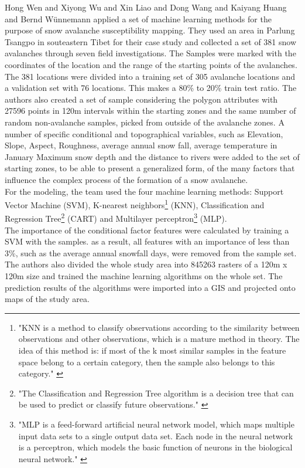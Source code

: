 \documentclass[../masterarbeit.tex]{subfiles}
\begin{document}
Hong Wen and Xiyong Wu and Xin Liao and Dong Wang and Kaiyang Huang and Bernd Wünnemann \textcite[]{WEN2022103535} applied a set of machine learning methods for the purpose of snow avalanche susceptibility mapping. They used an area in Parlung Tsangpo in souteastern Tibet for their case study and collected a set of 381 snow avalanches through seven field investigations. The Samples were marked with the coordinates of the location and the range  of the starting points of the avalanches. 
The 381 locations were divided into a training set of 305 avalanche locations and a validation set with 76 locations. This makes a 80\% to 20\% train test ratio.
The authors also created a set of sample considering the polygon attributes with 27596 points in 120m intervals within the starting zones and the same number of random non-avalanche samples, picked from outside of the avalanche zones. 
A number of specific conditional and topographical variables, such as Elevation, Slope, Aspect, Roughness, average annual snow fall, average temperature in January Maximum snow depth and the distance to rivers were added to the set of starting zones, to be able to present a generalized form, of the many factors that influence the complex process of the formation of a snow avalanche. \autocite[]{WEN2022103535} \\
For the modeling, the team used the four machine learning methods: Support Vector Machine (SVM), K-nearest neighbors\footnote{"KNN is a method to classify observations according to the similarity between observations and other observations, which is a mature method in theory. The idea of this method is: if most of the k most similar samples in the feature space belong to a certain category, then the sample also belongs to this category." \autocite[]{WEN2022103535} } (KNN), Classification and Regression Tree\footnote{"The Classification and Regression Tree algorithm is a decision tree that can be used to predict or classify future observations." \autocite[]{WEN2022103535} } (CART) and  Multilayer perceptron\footnote{"MLP is a feed-forward artificial neural network model, which maps multiple input data sets to a single output data set. Each node in the neural network is a perceptron, which models the basic function of neurons in the biological neural network." \autocite[]{WEN2022103535} } (MLP). \autocite[]{WEN2022103535} \\
The importance of the conditional factor features were calculated by training a SVM with the samples. as a result, all features with an importance of less than 3\%, such as the average annual snowfall days, were removed from the sample set. The authors also divided the whole study area into 845263 rasters of a 120m x 120m size and trained the machine learning algorithms on the whole set. The prediction results of the algorithms were imported into a GIS and projected onto maps of the study area. \autocite[]{WEN2022103535} \\
\end{document}
